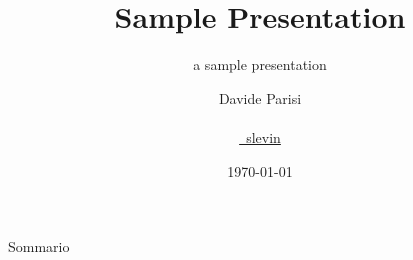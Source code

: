 \documentclass[trans]{beamer}
\title[Sample]{Sample Presentation}
\subtitle{a sample presentation}
\author[D.~Parisi]{Davide Parisi \\
  \email{\mail~davideparisi@gmail.com} \\
  \href{http://twitter.com/slevin}{\twitter~slevin}}
\date{\today}
\begin{document}
{
  \begin{frame}[plain]
    \vspace{15em}
    \begin{titleBox}
      \maketitle
    \end{titleBox}
  \end{frame}
}

\begin{frame}{Sommario}
	\tableofcontents
\end{frame}


\end{document}
